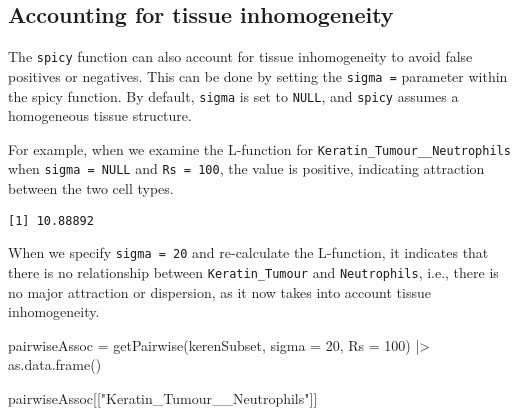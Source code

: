 \documentclass[
  letterpaper,
  DIV=11,
  numbers=noendperiod]{scrreprt}
\newenvironment{Shaded}{\begin{snugshade}}{\end{snugshade}}
\newcommand{\AttributeTok}[1]{\textcolor[rgb]{0.40,0.45,0.13}{#1}}
\newcommand{\CommentTok}[1]{\textcolor[rgb]{0.37,0.37,0.37}{#1}}
\newcommand{\ConstantTok}[1]{\textcolor[rgb]{0.56,0.35,0.01}{#1}}
\newcommand{\DecValTok}[1]{\textcolor[rgb]{0.68,0.00,0.00}{#1}}
\newcommand{\FunctionTok}[1]{\textcolor[rgb]{0.28,0.35,0.67}{#1}}
\newcommand{\NormalTok}[1]{\textcolor[rgb]{0.00,0.23,0.31}{#1}}
\newcommand{\OtherTok}[1]{\textcolor[rgb]{0.00,0.23,0.31}{#1}}
\newcommand{\SpecialCharTok}[1]{\textcolor[rgb]{0.37,0.37,0.37}{#1}}
\newcommand{\StringTok}[1]{\textcolor[rgb]{0.13,0.47,0.30}{#1}}
\begin{document}
\subsection{Accounting for tissue
inhomogeneity}\label{accounting-for-tissue-inhomogeneity}

The \texttt{spicy} function can also account for tissue inhomogeneity to
avoid false positives or negatives. This can be done by setting the
\texttt{sigma\ =} parameter within the spicy function. By default,
\texttt{sigma} is set to \texttt{NULL}, and \texttt{spicy} assumes a
homogeneous tissue structure.

For example, when we examine the L-function for
\texttt{Keratin\_Tumour\_\_Neutrophils} when \texttt{sigma\ =\ NULL} and
\texttt{Rs\ =\ 100}, the value is positive, indicating attraction
between the two cell types.

\begin{Shaded}
\end{Shaded}

\begin{verbatim}
[1] 10.88892
\end{verbatim}

When we specify \texttt{sigma\ =\ 20} and re-calculate the L-function,
it indicates that there is no relationship between
\texttt{Keratin\_Tumour} and \texttt{Neutrophils}, i.e., there is no
major attraction or dispersion, as it now takes into account tissue
inhomogeneity.

\begin{Shaded}
\begin{Highlighting}[]
\NormalTok{pairwiseAssoc }\OtherTok{=} \FunctionTok{getPairwise}\NormalTok{(kerenSubset, }
                            \AttributeTok{sigma =} \DecValTok{20}\NormalTok{, }
                            \AttributeTok{Rs =} \DecValTok{100}\NormalTok{) }\SpecialCharTok{|\textgreater{}}
  \FunctionTok{as.data.frame}\NormalTok{()}

\NormalTok{pairwiseAssoc[[}\StringTok{"Keratin\_Tumour\_\_Neutrophils"}\NormalTok{]]}
\end{Highlighting}
\end{Shaded}
\end{document}

